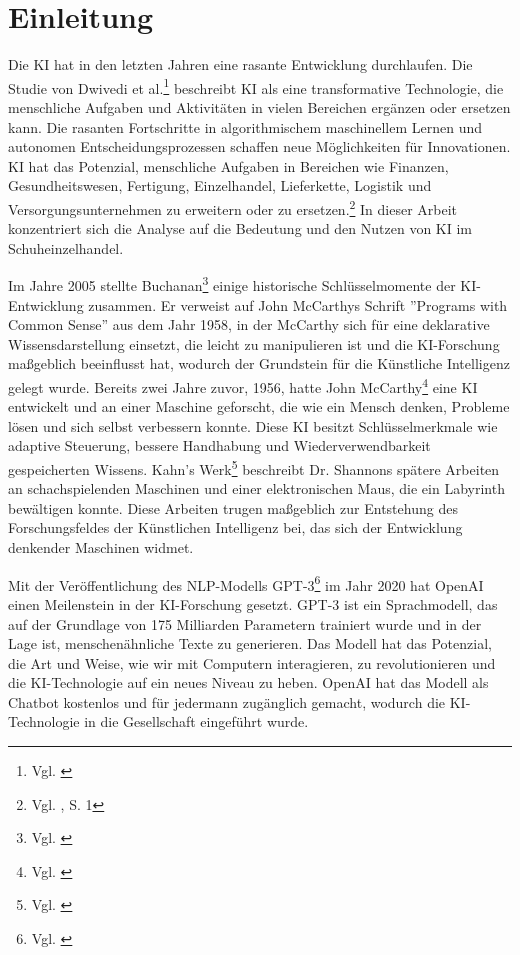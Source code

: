 

\section{Einleitung} 
\label{sec:einleitung}

Die KI hat in den letzten Jahren eine rasante Entwicklung durchlaufen. Die Studie von Dwivedi et al.\footnote{Vgl. \cite{DwivediHughes2021}} beschreibt KI als eine transformative Technologie, die menschliche Aufgaben und Aktivitäten in vielen Bereichen ergänzen oder ersetzen kann. Die rasanten Fortschritte in algorithmischem maschinellem Lernen und autonomen Entscheidungsprozessen schaffen neue Möglichkeiten für Innovationen. KI hat das Potenzial, menschliche Aufgaben in Bereichen wie Finanzen, Gesundheitswesen, Fertigung, Einzelhandel, Lieferkette, Logistik und Versorgungsunternehmen zu erweitern oder zu ersetzen.\footnote{Vgl. \cite{DwivediHughes2021}, S. 1} 
In dieser Arbeit konzentriert sich die Analyse auf die Bedeutung und den Nutzen von KI im Schuheinzelhandel.

Im Jahre 2005 stellte Buchanan\footnote{Vgl. \cite{Buchanan2005}} einige historische Schlüsselmomente der KI-Entwicklung zusammen. Er verweist auf John McCarthys Schrift ''Programs with Common Sense'' aus dem Jahr 1958, in der McCarthy sich für eine deklarative Wissensdarstellung einsetzt, die leicht zu manipulieren ist und die KI-Forschung maßgeblich beeinflusst hat, wodurch der Grundstein für die Künstliche Intelligenz gelegt wurde. Bereits zwei Jahre zuvor, 1956, hatte John McCarthy\footnote{Vgl. \cite{Mccarthy2006}} eine KI entwickelt und an einer Maschine geforscht, die wie ein Mensch denken, Probleme lösen und sich selbst verbessern konnte. Diese KI besitzt Schlüsselmerkmale wie adaptive Steuerung, bessere Handhabung und Wiederverwendbarkeit gespeicherten Wissens. Kahn's Werk\footnote{Vgl. \cite{Kahn2001}} beschreibt Dr. Shannons spätere Arbeiten an schachspielenden Maschinen und einer elektronischen Maus, die ein Labyrinth bewältigen konnte. Diese Arbeiten trugen maßgeblich zur Entstehung des Forschungsfeldes der Künstlichen Intelligenz bei, das sich der Entwicklung denkender Maschinen widmet. 

Mit der Veröffentlichung des NLP-Modells GPT-3\footnote{Vgl. \cite{Brown2020}} im Jahr 2020 hat OpenAI einen Meilenstein in der KI-Forschung gesetzt. GPT-3 ist ein Sprachmodell, das auf der Grundlage von 175 Milliarden Parametern trainiert wurde und in der Lage ist, menschenähnliche Texte zu generieren. Das Modell hat das Potenzial, die Art und Weise, wie wir mit Computern interagieren, zu revolutionieren und die KI-Technologie auf ein neues Niveau zu heben. OpenAI hat das Modell als Chatbot kostenlos und für jedermann zugänglich gemacht, wodurch die KI-Technologie in die Gesellschaft eingeführt wurde. 

